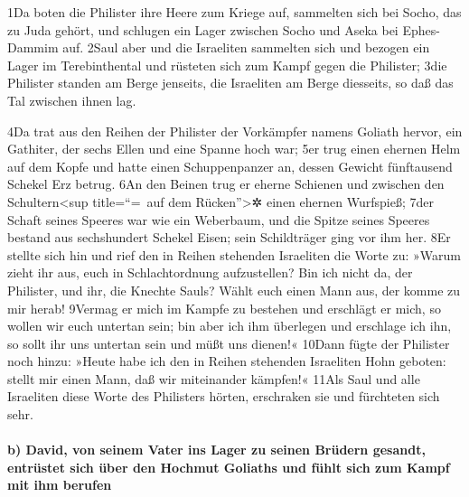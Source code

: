 1Da boten die Philister ihre Heere zum Kriege auf, sammelten sich bei
Socho, das zu Juda gehört, und schlugen ein Lager zwischen Socho und
Aseka bei Ephes-Dammim auf. 2Saul aber und die Israeliten sammelten sich
und bezogen ein Lager im Terebinthental und rüsteten sich zum Kampf
gegen die Philister; 3die Philister standen am Berge jenseits, die
Israeliten am Berge diesseits, so daß das Tal zwischen ihnen lag.

4Da trat aus den Reihen der Philister der Vorkämpfer namens Goliath
hervor, ein Gathiter, der sechs Ellen und eine Spanne hoch war; 5er trug
einen ehernen Helm auf dem Kopfe und hatte einen Schuppenpanzer an,
dessen Gewicht fünftausend Schekel Erz betrug. 6An den Beinen trug er
eherne Schienen und zwischen den Schultern\textless sup title=``=~auf
dem Rücken''\textgreater✲ einen ehernen Wurfspieß; 7der Schaft seines
Speeres war wie ein Weberbaum, und die Spitze seines Speeres bestand aus
sechshundert Schekel Eisen; sein Schildträger ging vor ihm her. 8Er
stellte sich hin und rief den in Reihen stehenden Israeliten die Worte
zu: »Warum zieht ihr aus, euch in Schlachtordnung aufzustellen? Bin ich
nicht da, der Philister, und ihr, die Knechte Sauls? Wählt euch einen
Mann aus, der komme zu mir herab! 9Vermag er mich im Kampfe zu bestehen
und erschlägt er mich, so wollen wir euch untertan sein; bin aber ich
ihm überlegen und erschlage ich ihn, so sollt ihr uns untertan sein und
müßt uns dienen!« 10Dann fügte der Philister noch hinzu: »Heute habe ich
den in Reihen stehenden Israeliten Hohn geboten: stellt mir einen Mann,
daß wir miteinander kämpfen!« 11Als Saul und alle Israeliten diese Worte
des Philisters hörten, erschraken sie und fürchteten sich sehr.

\hypertarget{b-david-von-seinem-vater-ins-lager-zu-seinen-bruxfcdern-gesandt-entruxfcstet-sich-uxfcber-den-hochmut-goliaths-und-fuxfchlt-sich-zum-kampf-mit-ihm-berufen}{%
\paragraph{b) David, von seinem Vater ins Lager zu seinen Brüdern
gesandt, entrüstet sich über den Hochmut Goliaths und fühlt sich zum
Kampf mit ihm
berufen}\label{b-david-von-seinem-vater-ins-lager-zu-seinen-bruxfcdern-gesandt-entruxfcstet-sich-uxfcber-den-hochmut-goliaths-und-fuxfchlt-sich-zum-kampf-mit-ihm-berufen}}

